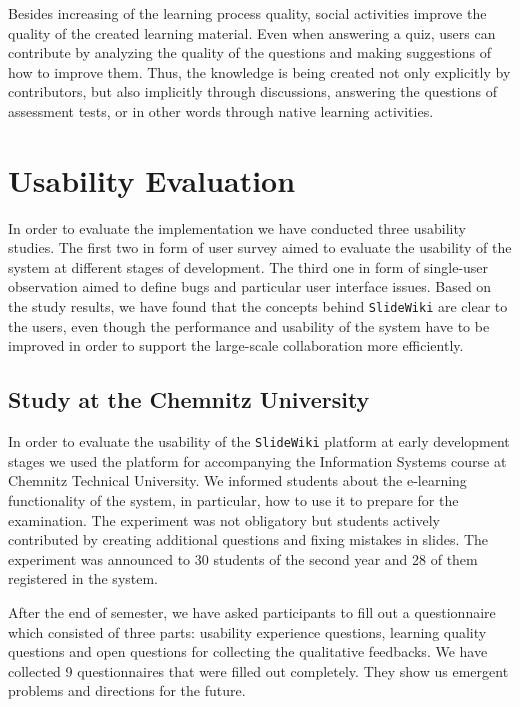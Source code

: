\documentclass[PhD, Submit, ngerman,UKenglish,table]{scrbook}
\begin{document}
Besides increasing of the learning process quality, social activities improve the quality of the created learning material.
Even when answering a quiz, users can contribute by analyzing the quality of the questions and making suggestions of how to improve them.
Thus, the knowledge is being created not only explicitly by contributors, but also implicitly through discussions, answering the questions of assessment tests, or in other words through native learning activities.


\section{Usability Evaluation}
\label{SlideWiki_limitations}

In order to evaluate the implementation we have conducted three usability studies.
The first two in form of user survey aimed to evaluate the usability of the system at different stages of development. 
The third one in form of single-user observation aimed to define bugs and particular user interface issues.
Based on the study results, we have found that the concepts behind \texttt{SlideWiki} are clear to the users, even though the performance and usability of the system have to be improved in order to support the large-scale collaboration more efficiently.



\subsection{Study at the Chemnitz University}

In order to evaluate the usability of the \texttt{SlideWiki} platform at early development stages we used the platform for accompanying the Information Systems course at Chemnitz Technical University.
We informed students about the e-learning functionality of the system, in particular, how to use it to prepare for the examination.
The experiment was not obligatory but students actively contributed by creating additional questions and fixing mistakes in slides.
The experiment was announced to 30 students of the second year and 28 of them registered in the system.

After the end of semester, we have asked participants to fill out a questionnaire which consisted of three parts: usability experience questions, learning quality questions and open questions for collecting the qualitative feedbacks.
We have collected 9 questionnaires that were filled out completely.
They show us emergent problems and directions for the future.
\end{document}
